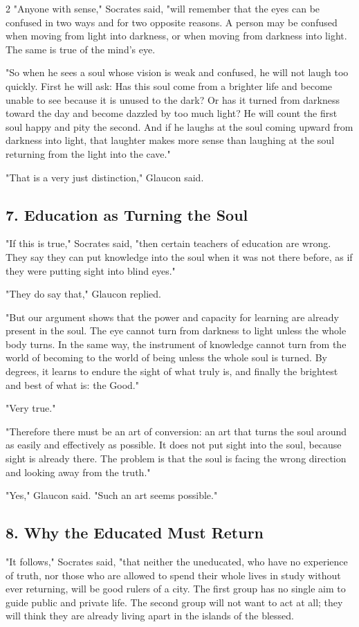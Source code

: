 \documentclass[12pt]{article}
\begin{document}
\begin{multicols}{2}
"Anyone with sense," Socrates said, "will remember that the eyes can be confused in two ways and for two opposite reasons. A person may be confused when moving from light into darkness, or when moving from darkness into light. The same is true of the mind's eye.

"So when he sees a soul whose vision is weak and confused, he will not laugh too quickly. First he will ask: Has this soul come from a brighter life and become unable to see because it is unused to the dark? Or has it turned from darkness toward the day and become dazzled by too much light? He will count the first soul happy and pity the second. And if he laughs at the soul coming upward from darkness into light, that laughter makes more sense than laughing at the soul returning from the light into the cave."

"That is a very just distinction," Glaucon said.

\subsection*{7. Education as Turning the Soul}
"If this is true," Socrates said, "then certain teachers of education are wrong. They say they can put knowledge into the soul when it was not there before, as if they were putting sight into blind eyes."

"They do say that," Glaucon replied.

"But our argument shows that the power and capacity for learning are already present in the soul. The eye cannot turn from darkness to light unless the whole body turns. In the same way, the instrument of knowledge cannot turn from the world of becoming to the world of being unless the whole soul is turned. By degrees, it learns to endure the sight of what truly is, and finally the brightest and best of what is: the Good."

"Very true."

"Therefore there must be an art of conversion: an art that turns the soul around as easily and effectively as possible. It does not put sight into the soul, because sight is already there. The problem is that the soul is facing the wrong direction and looking away from the truth."

"Yes," Glaucon said. "Such an art seems possible."

\subsection*{8. Why the Educated Must Return}
"It follows," Socrates said, "that neither the uneducated, who have no experience of truth, nor those who are allowed to spend their whole lives in study without ever returning, will be good rulers of a city. The first group has no single aim to guide public and private life. The second group will not want to act at all; they will think they are already living apart in the islands of the blessed.


\end{multicols}
\end{document}
